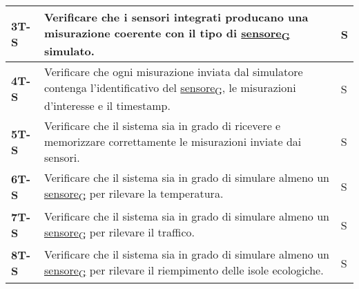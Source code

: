 \begin{longtable}{|>{\raggedright\arraybackslash}m{}|>{\raggedright\arraybackslash}m{}|>{\raggedright\arraybackslash}m{}|}
	\hline
	\textbf{3T-S}   & Verificare che i sensori integrati producano una misurazione coerente con il tipo di \href{https://7last.github.io/docs/pb/documentazione-interna/glossario\#sensore}{sensore\textsubscript{G}} simulato.                                                                                                                                                                                                & S              \\
	\hline
	\textbf{4T-S}   & Verificare che ogni misurazione inviata dal simulatore contenga l’identificativo del \href{https://7last.github.io/docs/pb/documentazione-interna/glossario\#sensore}{sensore\textsubscript{G}}, le misurazioni d'interesse e il timestamp.                                                                                                                                                              & S              \\
	\hline
	\textbf{5T-S}   & Verificare che il sistema sia in grado di ricevere e memorizzare correttamente le misurazioni inviate dai sensori.                                                                                                                                                                                                                                                                                       & S              \\
	\hline
	\textbf{6T-S}   & Verificare che il sistema sia in grado di simulare almeno un \href{https://7last.github.io/docs/pb/documentazione-interna/glossario\#sensore}{sensore\textsubscript{G}} per rilevare la temperatura.                                                                                                                                                                                                     & S              \\
	\hline
	\textbf{7T-S}   & Verificare che il sistema sia in grado di simulare almeno un \href{https://7last.github.io/docs/pb/documentazione-interna/glossario\#sensore}{sensore\textsubscript{G}} per rilevare il traffico.                                                                                                                                                                                                        & S              \\
	\hline
	\textbf{8T-S}   & Verificare che il sistema sia in grado di simulare almeno un \href{https://7last.github.io/docs/pb/documentazione-interna/glossario\#sensore}{sensore\textsubscript{G}} per rilevare il riempimento delle isole ecologiche.                                                                                                                                                                              & S              \\

\end{longtable}

